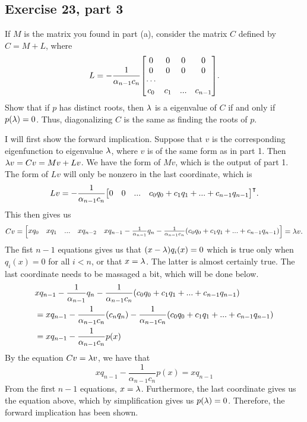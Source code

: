 \subsection{Exercise 23, part 3}
If $M$ is the matrix you found in part (a), consider the matrix $C$ defined by $C = M + L$, where 
\[L = -\frac{1}{\alpha_{n-1}c_n}\mqty[0&0&0&0\\0&0&0&0\\\cdots\\c_0&c_1&...&c_{n-1}].\]
Show that if $p$ has distinct roots, then $\mathrm{\lambda}$ is a eigenvalue of $C$ if and only if $p(\mathrm{\lambda}) = 0$. Thus, diagonalizing $C$ is the same as finding the roots of $p$. 
\partbreak
\begin{solution}

    I will first show the forward implication. Suppose that $v$ is the corresponding eigenfunction to eigenvalue $\mathrm{\lambda}$, where $v$ is of the same form as in part 1. Then $\mathrm{\lambda} v = Cv = Mv + Lv$. We have the form of $Mv$, which is the output of part 1. The form of $Lv$ will only be nonzero in the last coordinate, which is 
    \[Lv = -\frac{1}{\alpha_{n-1}c_n}\mqty[0&0&...& c_0q_0 + c_1q_1 + ... + c_{n-1}q_{n-1}]\T.\]
    This then gives us
    \[Cv = \mqty[xq_0&xq_1&...&xq_{n-2}& xq_{n-1} - \frac{1}{\alpha_{n-1}}q_n - \frac{1}{\alpha_{n-1}c_n}\qty(c_0q_0 + c_1q_1 + ... + c_{n-1}q_{n-1})] = \lm v.\]
    The fist $n-1$ equations gives us that $(x - \mathrm{\lambda})q_i(x) = 0$ which is true only when $q_i(x) = 0$ for all $i < n$, or that $x = \mathrm{\lambda}$. The latter is almost certainly true. The last coordinate needs to be massaged a bit, which will be done below. 
    \begin{align*}
        &xq_{n-1} - \frac{1}{\alpha_{n-1}}q_n - \frac{1}{\alpha_{n-1}c_n}\qty(c_0q_0 + c_1q_1 + ... + c_{n-1}q_{n-1})\\
        &= xq_{n-1} - \frac{1}{\alpha_{n-1}c_n}(c_nq_n) - \frac{1}{\alpha_{n-1}c_n}(c_0q_0 + c_1q_1 + ... + c_{n-1}q_{n-1})\\
        &= xq_{n-1} - \frac{1}{\alpha_{n-1}c_n}p(x)
    \end{align*}
    By the equation $Cv = \mathrm{\lambda} v$, we have that 
    \[xq_{n-1} - \frac{1}{\alpha_{n-1}c_n}p(x) = xq_{n-1}\]
    From the first $n-1$ equations, $x = \mathrm{\lambda}$. Furthermore, the last coordinate gives us the equation above, which by simplification gives us $p(\mathrm{\lambda}) = 0$. Therefore, the forward implication has been shown. \par


\end{solution}
